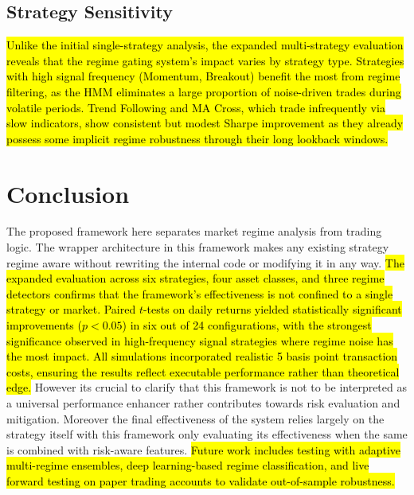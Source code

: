 \documentclass[conference]{IEEEtran}
\begin{document}
\subsection{Strategy Sensitivity}

\hl{Unlike the initial single-strategy analysis, the expanded multi-strategy evaluation reveals that the regime gating system's impact varies by strategy type. Strategies with high signal frequency (Momentum, Breakout) benefit the most from regime filtering, as the HMM eliminates a large proportion of noise-driven trades during volatile periods. Trend Following and MA Cross, which trade infrequently via slow indicators, show consistent but modest Sharpe improvement as they already possess some implicit regime robustness through their long lookback windows.}

\section{Conclusion}

The proposed framework here separates market regime analysis from trading logic. The wrapper architecture in this framework makes any existing strategy regime aware without rewriting the internal code or modifying it in any way. \hl{The expanded evaluation across six strategies, four asset classes, and three regime detectors confirms that the framework's effectiveness is not confined to a single strategy or market. Paired $t$-tests on daily returns yielded statistically significant improvements ($p < 0.05$) in six out of 24 configurations, with the strongest significance observed in high-frequency signal strategies where regime noise has the most impact. All simulations incorporated realistic 5 basis point transaction costs, ensuring the results reflect executable performance rather than theoretical edge.} However its crucial to clarify that this framework is not to be interpreted as a universal performance enhancer rather contributes towards risk evaluation and mitigation. Moreover the final effectiveness of the system relies largely on the strategy itself with this framework only evaluating its effectiveness when the same is combined with risk-aware features. \hl{Future work includes testing with adaptive multi-regime ensembles, deep learning-based regime classification, and live forward testing on paper trading accounts to validate out-of-sample robustness.}
\end{document}
